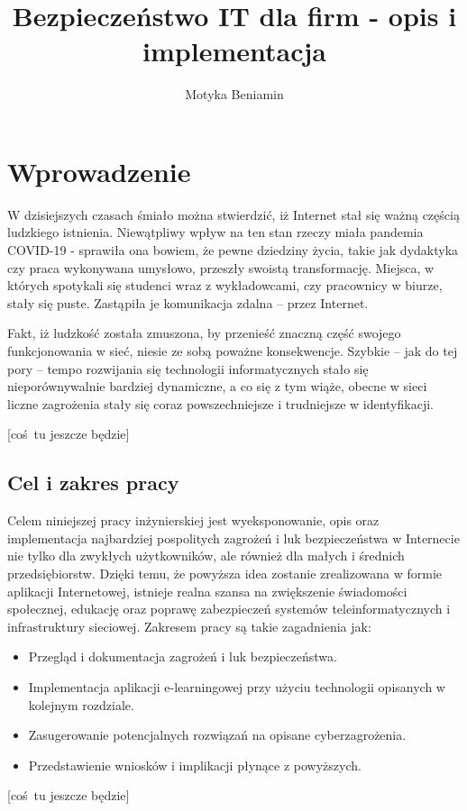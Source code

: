 \documentclass[12pt,twoside]{article}
\author{Motyka Beniamin}
\title{Bezpieczeństwo IT dla firm - opis i implementacja}
\begin{document}
\maketitle

\blankpage

\tableofcontents

\clearpage
\blankpage

\clearpage
\section{Wprowadzenie}

W dzisiejszych czasach śmiało można stwierdzić, iż	Internet stał się ważną częścią ludzkiego istnienia. Niewątpliwy wpływ na ten stan rzeczy miała pandemia COVID-19 - sprawiła ona bowiem, że pewne dziedziny życia, takie jak dydaktyka czy praca wykonywana umysłowo, przeszły swoistą transformację. Miejsca, w których spotykali się studenci wraz z wykładowcami, czy pracownicy w biurze, stały się puste. Zastąpiła je komunikacja zdalna -- przez Internet.

Fakt, iż ludzkość została zmuszona, by przenieść znaczną część swojego funkcjonowania w sieć, niesie ze sobą poważne konsekwencje. Szybkie -- jak do tej pory -- tempo rozwijania się technologii informatycznych stało się nieporównywalnie bardziej dynamiczne, a co się z tym wiąże, obecne w sieci liczne zagrożenia stały się coraz powszechniejsze i trudniejsze w identyfikacji.

[coś tu jeszcze będzie]

\subsection{Cel i zakres pracy}

Celem niniejszej pracy inżynierskiej jest wyeksponowanie, opis oraz implementacja najbardziej pospolitych zagrożeń i luk bezpieczeństwa w Internecie nie tylko dla zwykłych użytkowników, ale również dla małych i średnich przedsiębiorstw. Dzięki temu, że powyższa idea zostanie zrealizowana w formie aplikacji Internetowej, istnieje realna szansa na zwiększenie świadomości społecznej, edukację oraz poprawę zabezpieczeń systemów teleinformatycznych i infrastruktury sieciowej. Zakresem pracy są takie zagadnienia jak:
\begin{itemize}
\item Przegląd i dokumentacja zagrożeń i luk bezpieczeństwa.
\item Implementacja aplikacji e-learningowej przy użyciu technologii opisanych w kolejnym rozdziale.
\item Zasugerowanie potencjalnych rozwiązań na opisane cyberzagrożenia.
\item Przedstawienie wniosków i implikacji płynące z powyższych.
\end{itemize} 
[coś tu jeszcze będzie]
\end{document}
